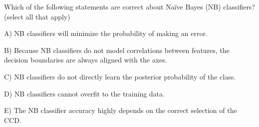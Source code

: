 Which of the following statements are correct about Naïve Bayes (NB) classifiers? (select all that apply)


A) NB classifiers will minimize the probability of making an error.


B) Because NB classifiers do not model correlations between features, the decision boundaries are always aligned with the axes.


C) NB classifiers do not directly learn the posterior probability of the class.


D) NB classifiers cannot overfit to the training data.


E) The NB classifier accuracy highly depends on the correct selection of the CCD.
